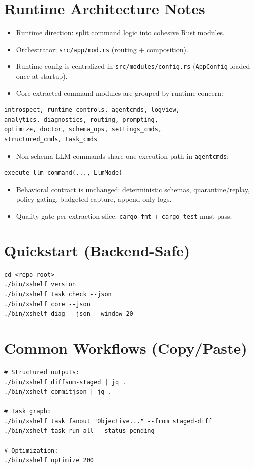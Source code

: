 \documentclass[11pt]{article}
\begin{document}
\section*{Runtime Architecture Notes}
\begin{itemize}
  \item Runtime direction: split command logic into cohesive Rust modules.
  \item Orchestrator: \texttt{src/app/mod.rs} (routing + composition).
  \item Runtime config is centralized in \texttt{src/modules/config.rs} (\texttt{AppConfig} loaded once at startup).
  \item Core extracted command modules are grouped by runtime concern:
\end{itemize}
\begin{lstlisting}[style=cx]
introspect, runtime_controls, agentcmds, logview,
analytics, diagnostics, routing, prompting,
optimize, doctor, schema_ops, settings_cmds,
structured_cmds, task_cmds
\end{lstlisting}
\begin{itemize}
  \item Non-schema LLM commands share one execution path in \texttt{agentcmds}:
\end{itemize}
\begin{lstlisting}[style=cx]
execute_llm_command(..., LlmMode)
\end{lstlisting}
\begin{itemize}
  \item Behavioral contract is unchanged: deterministic schemas, quarantine/replay, policy gating, budgeted capture, append-only logs.
  \item Quality gate per extraction slice: \texttt{cargo fmt} + \texttt{cargo test} must pass.
\end{itemize}

\section*{Quickstart (Backend-Safe)}
\begin{lstlisting}[style=cx]
cd <repo-root>
./bin/xshelf version
./bin/xshelf task check --json
./bin/xshelf core --json
./bin/xshelf diag --json --window 20
\end{lstlisting}

\section*{Common Workflows (Copy/Paste)}
\begin{lstlisting}[style=cx]
# Structured outputs:
./bin/xshelf diffsum-staged | jq .
./bin/xshelf commitjson | jq .

# Task graph:
./bin/xshelf task fanout "Objective..." --from staged-diff
./bin/xshelf task run-all --status pending

# Optimization:
./bin/xshelf optimize 200
\end{lstlisting}
\end{document}
